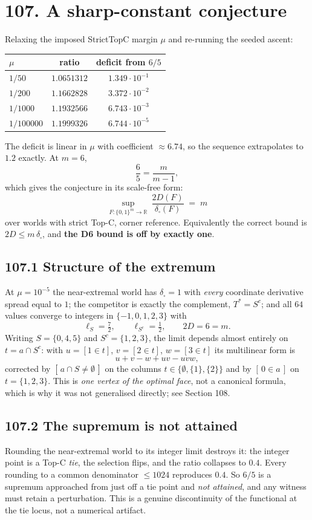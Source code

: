 \documentclass[9pt,twocolumn]{article}
\renewcommand{\_}{\CIGunderscore\allowbreak}
\begin{document}
\section*{107. A sharp-constant conjecture}
Relaxing the imposed StrictTopC margin $\mu$ and re-running the seeded ascent:
\begin{center}\scriptsize
\begin{tabularx}{0.98\columnwidth}{Xcc}
\toprule
$\mu$ & ratio & deficit from $6/5$\\
\midrule
$1/50$ & $1.0651312$ & $1.349\cdot10^{-1}$\\
$1/200$ & $1.1662828$ & $3.372\cdot10^{-2}$\\
$1/1000$ & $1.1932566$ & $6.743\cdot10^{-3}$\\
$1/100000$ & $1.1999326$ & $6.744\cdot10^{-5}$\\
\bottomrule
\end{tabularx}
\end{center}
The deficit is linear in $\mu$ with coefficient $\approx6.74$, so the sequence extrapolates to $1.2$ exactly. At $m=6$,
\[
\frac{6}{5}=\frac{m}{m-1},
\]
which gives the conjecture in its scale-free form:
\[
\boxed{\ \sup_{F:\{0,1\}^m\to\mathbb{R}}\ \frac{2D(F)}{\delta_{\square}(F)}\;=\;m\ }
\]
over worlds with strict Top-C, corner reference. Equivalently the correct bound is $2D\le m\,\delta_{\square}$, and \textbf{the D6 bound is off by exactly one}.

\subsection*{107.1 Structure of the extremum}
At $\mu=10^{-5}$ the near-extremal world has $\delta_{\square}=1$ with \emph{every} coordinate derivative spread equal to $1$; the competitor is exactly the complement, $T^\ast=S^{c}$; and all $64$ values converge to integers in $\{-1,0,1,2,3\}$ with
\[
\ell_S=\tfrac72,\qquad \ell_{S^c}=\tfrac12,\qquad 2D=6=m .
\]
Writing $S=\{0,4,5\}$ and $S^c=\{1,2,3\}$, the limit depends almost entirely on $t=a\cap S^c$: with $u=[1\in t]$, $v=[2\in t]$, $w=[3\in t]$ its multilinear form is
\[
u+v-w+uv-uvw ,
\]
corrected by $[\,a\cap S\ne\emptyset\,]$ on the columns $t\in\{\emptyset,\{1\},\{2\}\}$ and by $[\,0\in a\,]$ on $t=\{1,2,3\}$. This is \emph{one vertex of the optimal face}, not a canonical formula, which is why it was not generalised directly; see Section 108.

\subsection*{107.2 The supremum is not attained}
Rounding the near-extremal world to its integer limit destroys it: the integer point is a Top-C \emph{tie}, the selection flips, and the ratio collapses to $0.4$. Every rounding to a common denominator $\le1024$ reproduces $0.4$. So $6/5$ is a supremum approached from just off a tie point and \emph{not attained}, and any witness must retain a perturbation. This is a genuine discontinuity of the functional at the tie locus, not a numerical artifact.
\end{document}
